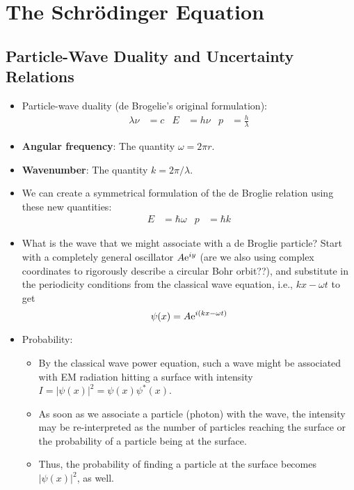\documentclass[../notes.tex]{subfiles}
\begin{document}
\chapter{The Schr\"{o}dinger Equation}
\section{Particle-Wave Duality and Uncertainty Relations}
\begin{itemize}
    \item {}Particle-wave duality (de Brogelie's original formulation):
    \begin{align*}
        \lambda\nu &= c&
        E &= h\nu&
        p &= \frac{h}{\lambda}
    \end{align*}
    \item \textbf{Angular frequency}: The quantity $\omega=2\pi r$.
    \item \textbf{Wavenumber}: The quantity $k=2\pi/\lambda$.
    \item We can create a symmetrical formulation of the de Broglie relation using these new quantities:
    \begin{align*}
        E &= \hbar\omega&
        p &= \hbar k
    \end{align*}
    \item What is the wave that we might associate with a de Broglie particle? Start with a completely general oscillator $A\e[iy]$ (are we also using complex coordinates to rigorously describe a circular Bohr orbit??), and substitute in the periodicity conditions from the classical wave equation, i.e., $kx-\omega t$ to get
    \begin{equation*}
        \psi(x) = A\e[i(kx-\omega t)]
    \end{equation*}
    \item Probability:
    \begin{itemize}
        \item By the classical wave power equation, such a wave might be associated with EM radiation hitting a surface with intensity $I=|\psi(x)|^2=\psi(x)\psi^*(x)$.
        \item As soon as we associate a particle (photon) with the wave, the intensity may be re-interpreted as the number of particles reaching the surface or the probability of a particle being at the surface.
        \item Thus, the probability of finding a particle at the surface becomes $|\psi(x)|^2$, as well.
    \end{itemize}

\end{itemize}
\end{document}
